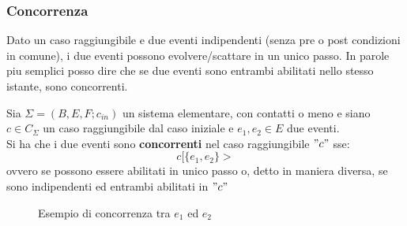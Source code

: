 \subsubsection{Concorrenza}
Dato un caso raggiungibile e due eventi indipendenti (senza pre o post
condizioni in comune), i due eventi possono evolvere/scattare in un unico passo. In parole piu
semplici posso dire che se due eventi sono entrambi abilitati nello stesso istante, sono
concorrenti.
\begin{definizione}
  Sia $\Sigma = (B, E, F;c_{in})$ un sistema elementare, con contatti o meno
  e siano $c\in C_\Sigma$ un caso raggiungibile dal caso iniziale e $e_1, e_2\in
  E$ due eventi. \\
  Si ha che i due eventi sono \textbf{concorrenti} nel caso
  raggiungibile $"c"$ sse:
  \[c[\{e_1, e_2\}>\]
  ovvero se possono essere abilitati in unico passo o, detto in maniera
  diversa, se sono indipendenti ed entrambi abilitati in $"c"$
  \begin{figure}[H]
    \centering
    \caption{Esempio di concorrenza tra $e_1$ ed $e_2$}
  \end{figure}
\end{definizione} \vspace{5mm} %
